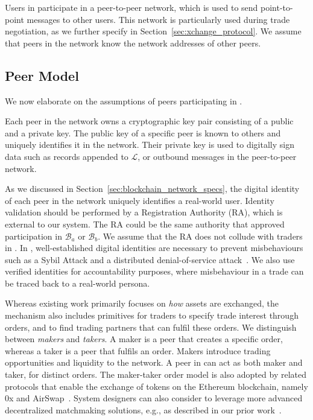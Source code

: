 Users in \ModelName{} participate in a peer-to-peer network, which is used to send point-to-point messages to other users.
This network is particularly used during trade negotiation, as we further specify in Section~\ref{sec:xchange_protocol}.
We assume that peers in the \ModelName{} network know the network addresses of other peers.

\subsection{Peer Model}
We now elaborate on the assumptions of peers participating in \ModelName{}.

Each peer in the \ModelName{} network owns a cryptographic key pair consisting of a public and a private key. 
The public key of a specific peer is known to others and uniquely identifies it in the network. 
Their private key is used to digitally sign data such as records appended to $ \mathcal{L} $, or outbound messages in the peer-to-peer network.

As we discussed in Section~\ref{sec:blockchain_network_specs}, the digital identity of each peer in the \ModelName{} network uniquely identifies a real-world user.
Identity validation should be performed by a Registration Authority (RA), which is external to our system.
The RA could be the same authority that approved participation in $ \mathcal{B}_a $ or $ \mathcal{B}_b $.
We assume that the RA does not collude with traders in \ModelName{}.
In \ModelName{}, well-established digital identities are necessary to prevent misbehaviours such as a Sybil Attack and a distributed denial-of-service attack~\cite{douceur2002sybil,Specht2004DistributedDO}.
We also use verified identities for accountability purposes, where misbehaviour in a trade can be traced back to a real-world persona.

Whereas existing work primarily focuses on \emph{how} assets are exchanged, the \ModelName{} mechanism also includes primitives for traders to specify trade interest through orders, and to find trading partners that can fulfil these orders.
We distinguish between \emph{makers} and \emph{takers}.
A maker is a peer that creates a specific order, whereas a taker is a peer that fulfils an order.
Makers introduce trading opportunities and liquidity to the \ModelName{} network.
A peer in \ModelName{} can act as both maker and taker, for distinct orders.
The maker-taker order model is also adopted by related protocols that enable the exchange of tokens on the Ethereum blockchain, namely 0x and AirSwap~\cite{warren20170x,airswap}.
System designers can also consider to leverage more advanced decentralized matchmaking solutions, e.g., as described in our prior work~\cite{vos2020match}.

